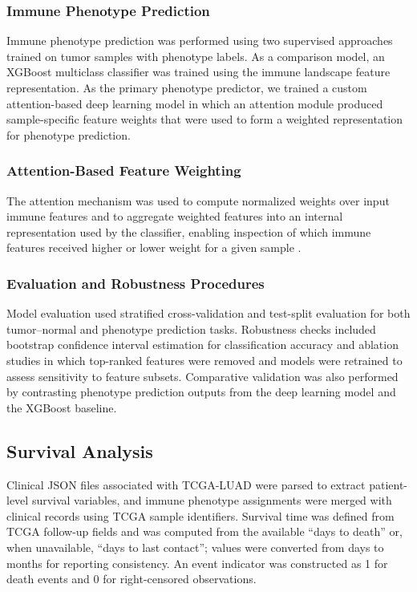 \documentclass[conference]{IEEEtran}
\begin{document}
\subsubsection{Immune Phenotype Prediction}
Immune phenotype prediction was performed using two supervised approaches trained on tumor samples with phenotype labels.
As a comparison model, an XGBoost multiclass classifier \cite{ChenGuestrin2016} was trained using the immune landscape feature representation.
As the primary phenotype predictor, we trained a custom attention-based deep learning model in which an attention module produced sample-specific feature weights that were used to form a weighted representation for phenotype prediction.

\subsubsection{Attention-Based Feature Weighting}
The attention mechanism was used to compute normalized weights over input immune features and to aggregate weighted features into an internal representation used by the classifier, enabling inspection of which immune features received higher or lower weight for a given sample \cite{Bahdanau2015}.

\subsubsection{Evaluation and Robustness Procedures}
Model evaluation used stratified cross-validation and test-split evaluation for both tumor--normal and phenotype prediction tasks.
Robustness checks included bootstrap confidence interval estimation for classification accuracy and ablation studies in which top-ranked features were removed and models were retrained to assess sensitivity to feature subsets.
Comparative validation was also performed by contrasting phenotype prediction outputs from the deep learning model and the XGBoost baseline.

\subsection{Survival Analysis}
Clinical JSON files associated with TCGA-LUAD were parsed to extract patient-level survival variables, and immune phenotype assignments were merged with clinical records using TCGA sample identifiers.
Survival time was defined from TCGA follow-up fields and was computed from the available ``days to death'' or, when unavailable, ``days to last contact''; values were converted from days to months for reporting consistency.
An event indicator was constructed as 1 for death events and 0 for right-censored observations.
\end{document}
